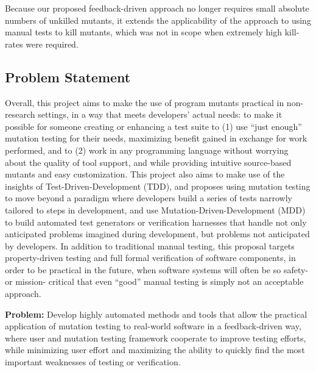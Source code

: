 Because our proposed feedback-driven approach no longer requires small absolute
numbers of unkilled mutants, it extends the applicability of the approach to
using manual tests to kill mutants, which was not in scope when extremely high
kill-rates were required.

\subsection{Problem Statement}

Overall, this project aims to make the use of program mutants practical in
non-research settings, in a way that meets developers' actual needs: to make it
possible for someone creating or enhancing a test suite to (1) use ``just
enough'' mutation testing for their needs, maximizing benefit gained in exchange
for work performed, and to (2) work in any programming language without worrying
about the quality of tool support, and while providing intuitive source-based
mutants and easy customization.  This project also aims to make use of the insights of
Test-Driven-Development (TDD), and proposes using mutation testing to move
beyond a paradigm where developers build a series of tests narrowly tailored to
steps in development, and use Mutation-Driven-Development (MDD) to build
automated test generators or verification harnesses that handle not only
anticipated problems imagined during development, but problems not anticipated
by developers.  In addition to traditional manual testing, this proposal targets
property-driven testing and full formal verification of software components, in
order to be practical in the future, when software systems will often be so
safety- or mission- critical that even ``good'' manual testing is simply not an
acceptable approach.


\begin{framed} {\bf Problem:} Develop highly automated methods and tools that
  allow the practical application of mutation testing to real-world software in
  a feedback-driven way, where user and mutation testing framework cooperate to
  improve testing efforts, while minimizing user effort and maximizing the
  ability to quickly find the most important weaknesses of testing or
  verification.
\end{framed}



